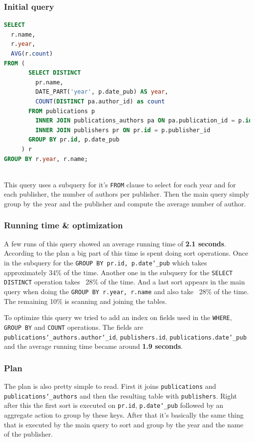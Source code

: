 \documentclass[doubleside, titlepage]{article}
\begin{document}
\subsubsection{Initial query}
		\begin{lstlisting}[language=SQL,showspaces=false,basicstyle=\ttfamily,numberstyle=\tiny,commentstyle=\color{gray}]
SELECT
  r.name,
  r.year,
  AVG(r.count)
FROM (
       SELECT DISTINCT
         pr.name,
         DATE_PART('year', p.date_pub) AS year,
         COUNT(DISTINCT pa.author_id) as count
       FROM publications p
         INNER JOIN publications_authors pa ON pa.publication_id = p.id
         INNER JOIN publishers pr ON pr.id = p.publisher_id
       GROUP BY pr.id, p.date_pub
     ) r
GROUP BY r.year, r.name;
		\end{lstlisting}
~\\
This query uses a subquery for it's \texttt{FROM} clause to select for each year and for each publisher, the number of authors per publisher. Then the main query simply group by the year and the publisher and compute the average number of author.~\\

\subsubsection{Running time \& optimization}

A few runs of this query showed an average running time of \textbf{2.1 seconds}. According to the plan a big part of this time is spent doing sort operations. Once in the subquery for the \texttt{GROUP BY pr.id, p.date\char`_pub} which takes approximately 34\% of the time. Another one in the subquery for the \texttt{SELECT DISTINCT} operation takes ~28\% of the time. And a last sort appears in the main query when doing the \texttt{GROUP BY r.year, r.name} and also take ~28\% of the time. The remaining 10\% is scanning and joining the tables.

To optimize this query we tried to add an index on fields used in the \texttt{WHERE}, \texttt{GROUP BY} and \texttt{COUNT} operations. The fields are \texttt{publications\char`_authors.author\char`_id}, \texttt{publishers.id}, \texttt{publications.date\char`_pub} and the average running time became around \textbf{1.9 seconds}.

\subsubsection{Plan}
The plan is also pretty simple to read. First it joins \texttt{publications} and \texttt{publications\char`_authors} and then the resulting table with \texttt{publishers}. Right after this the first sort is executed on \texttt{pr.id}, \texttt{p.date\char`_pub} followed by an aggregate action to group by these keys. After that it's basically the same thing that is executed by the main query to sort and group by the year and the name of the publisher.
\end{document}
